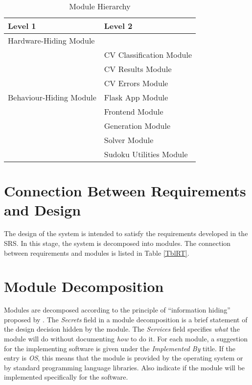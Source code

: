 \documentclass[12pt, titlepage]{article}
\begin{document}
\begin{table}[h!]
\centering
\begin{tabular}{p{} p{}}
\toprule
\textbf{Level 1} & \textbf{Level 2}\\
\midrule

{Hardware-Hiding Module} & ~ \\
\midrule

\multirow{7}{0.3\textwidth}{Behaviour-Hiding Module} & CV Classification Module\\
& CV Results Module\\
& CV Errors Module\\
& Flask App Module\\
& Frontend Module\\
\midrule

\multirow{3}{0.3\textwidth}{Software Decision Module} & {Generation Module}\\
& Solver Module\\
& Sudoku Utilities Module\\
\bottomrule

\end{tabular}
\caption{Module Hierarchy}
\label{TblMH}
\end{table}

\section{Connection Between Requirements and Design} \label{SecConnection}

The design of the system is intended to satisfy the requirements developed in
the SRS. In this stage, the system is decomposed into modules. The connection
between requirements and modules is listed in Table \ref{TblRT}.

\section{Module Decomposition} \label{SecMD}

Modules are decomposed according to the principle of ``information hiding''
proposed by \citet{ParnasEtAl1984}. The \emph{Secrets} field in a module
decomposition is a brief statement of the design decision hidden by the
module. The \emph{Services} field specifies \emph{what} the module will do
without documenting \emph{how} to do it. For each module, a suggestion for the
implementing software is given under the \emph{Implemented By} title. If the
entry is \emph{OS}, this means that the module is provided by the operating
system or by standard programming language libraries.  Also indicate if the
module will be implemented specifically for the software.
\end{document}
